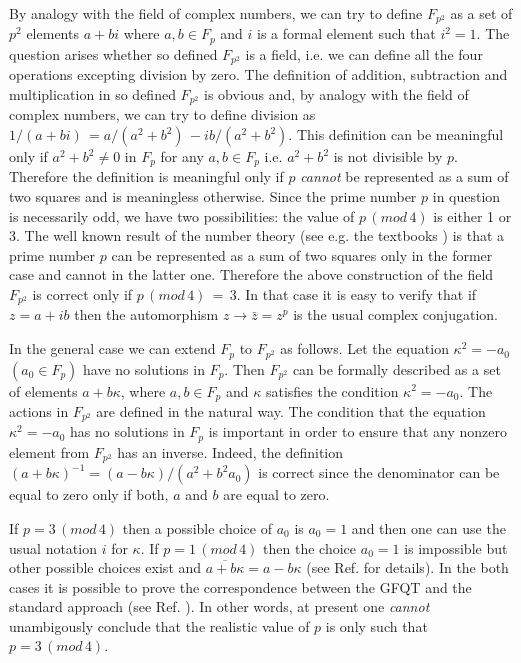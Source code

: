 \documentclass[a4paper,12pt]{article}%
\begin{document}
By analogy with the field of complex numbers, we can 
try to define $F_{p^2}$ as a set 
of $p^2$ elements $a+bi$ where $a,b\in F_p$ and $i$ is a 
formal element such that $i^2=1$. The question arises whether 
so defined $F_{p^2}$ is a field, i.e. we can define all the 
four operations excepting division by zero.
The definition of addition, subtraction and multiplication 
in so defined $F_{p^2}$ is obvious and, by analogy with the 
field of complex numbers, we can
try to define division as $1/(a+bi)\,=a/(a^2+b^2)\,-ib/(a^2+b^2)$.
This definition can be meaningful only if $a^2+b^2\neq 0$ in $F_p$
for any $a,b\in F_p$ i.e. $a^2+b^2$ is not divisible by $p$.
Therefore the definition is meaningful only if $p$ {\it cannot}
be represented as a sum of two squares and is meaningless otherwise.
Since the prime number $p$ in question is necessarily odd, we
have two possibilities: the value of $p\,(mod \,4)$ is either 1
or 3. The well known result of the number theory (see e.g. the 
textbooks \cite{VDW}) is that a prime number $p$ can be 
represented as a sum of two squares only in the former case
and cannot in the latter one. Therefore the above construction of
the field $F_{p^2}$ is correct only if $p\,(mod \,4)\,=\,3$.
In that case it is easy to verify that if $z=a+ib$ then the
automorphism $z\rightarrow {\bar z}=z^p$ is the usual complex
conjugation.

In the general case we can extend $F_p$ to $F_{p^2}$ as 
follows. Let the equation
$\kappa^2=-a_0$ $(a_0\in F_p)$ have no solutions in $F_p$.
Then $F_{p^2}$ can be formally described as a set of
elements $a+b\kappa$, where $a,b\in F_p$ and $\kappa$ 
satisfies the condition $\kappa^2=-a_0$. The actions in
$F_{p^2}$ are defined in the natural way. The condition
that the equation $\kappa^2=-a_0$ has no solutions in 
$F_p$ is important in order to ensure that any nonzero 
element from $F_{p^2}$ has an inverse.
Indeed, the definition 
$(a+b\kappa)^{-1}=(a-b\kappa)/(a^2+b^2a_0)$ is correct 
since the denominator can be equal to zero only if both,
$a$ and $b$ are equal to zero. 
  
If $p=3\, (mod \, 4)$ then a possible choice of $a_0$ is
$a_0=1$ and then one can use the usual notation $i$ for 
$\kappa$. If $p=1\, (mod \, 4)$ then the choice $a_0=1$
is impossible but other possible choices exist and
$\overline{a+b\kappa}=a-b\kappa$ (see Ref.
\cite{lev2} for details). In the both cases it is 
possible to prove the correspondence between the GFQT and 
the standard approach (see Ref. \cite{lev2}). In other
words, at present one {\it cannot} unambigously conclude that
the realistic value of $p$ is only such that 
$p=3\, (mod \, 4)$.
\end{document}
